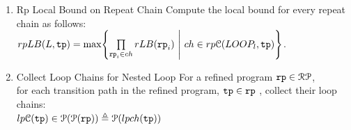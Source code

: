 \begin{enumerate}
\item  {Rp Local Bound on Repeat Chain}
Compute the local bound for every repeat chain as follows:
\\
$rpLB(L, \tpath) = \max \left\{ \prod\limits_{\rprog_i \in ch}  rLB(\rprog_i) 
~\middle\vert~ ch \in rp\mathcal{C}(LOOP_l, \tpath) \right\}
$.
%
\item {Collect Loop Chains for Nested Loop}
For a refined program $\mathtt{rp} \in \mathcal{RP}$, 
\\
for each transition path in the refined program, $\mathtt{tp} \in \mathtt{rp}$ , 
collect their loop chains: 
\\
$lp\mathcal{C}(\mathtt{tp}) \in \mathcal{P}(\mathcal{P}(\mathtt{rp})) \triangleq \mathcal{P}(lpch(\mathtt{tp}))$

\end{enumerate}
